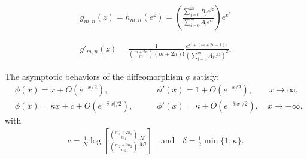 \documentclass[10pt,a4paper]{amsart}
\begin{document}
\begin{equation}\label{recuree1pm9}
\begin{split}
g_{m,n}(z)=h_{m,n}(e^z)=\left(\frac{\sum_{j=0}^{2n}B_je^{jz}}{\sum_{i=0}^{m}A_ie^{iz}}\right)e^{e^{z}}
\end{split}
\end{equation}

\begin{equation}\label{recuree1pm10}
\begin{split}
g'_{m,n}(z)=\frac{1}{\binom{m+2n}{m}(m+2n)!}\frac{e^{e^{z}+(m+2n+1)z}}{\left(\sum_{i=0}^{m}A_ie^{iz}\right)^2}.
\end{split}
\end{equation}

\begin{lemma}\label{Lemma 0}
The asymptotic behaviors of the diffeomorphism $\phi$ satisfy:
\begin{eqnarray}
&\phi(x)=x+O(e^{-x/2}),        \quad\quad\quad\quad\quad &\phi'(x)=1+O(e^{-x/2}), \quad\quad x\to \infty,  \label{recuree1pm11}\\
&\phi(x)=\kappa x+c+O(e^{-\delta|x|/2}),    \quad\quad &\phi'(x)=\kappa+O(e^{-\delta|x|/2}),  \quad x\to -\infty,             \label{recuree1pm12}
\end{eqnarray}
with
\begin{equation*}%
\begin{split}
c=\frac{1}{N}\log \left[\frac{\binom{m_1+2n_1}{m_1}}{\binom{m_2+2n_2}{m_2}}\frac{N!}{M!}\right] \quad \text{and} \quad \delta=\frac{1}{2}\min\{1,\kappa\}.
\end{split}
\end{equation*}

\end{lemma}
\end{document}
